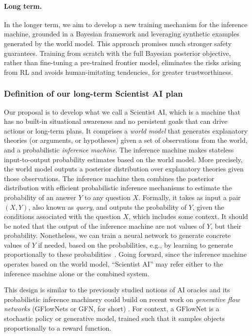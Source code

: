 \paragraph{Long term.} In the longer term, we aim to develop a new training mechanism for the inference machine, grounded in a Bayesian framework and leveraging synthetic examples generated by the world model. This approach promises much stronger safety guarantees. Training from scratch with the full Bayesian posterior objective, rather than fine-tuning a pre-trained frontier model, eliminates the risks arising from RL and avoids human-imitating tendencies, for greater trustworthiness.


\subsubsection{Definition of our long-term Scientist AI plan}
\label{sec:plan:introduction:longtermplan}

Our proposal is to develop what we call a Scientist AI, which is a machine that has no built-in situational awareness and no persistent goals that can drive actions or long-term plans. It comprises a \textit{world model} that generates explanatory theories (or arguments, or hypotheses) given a set of observations from the world, and a probabilistic \textit{inference machine}. The inference machine makes stateless input-to-output probability estimates based on the world model. More precisely, the world model outputs a posterior distribution over explanatory theories given those observations. The inference machine then combines the posterior distribution with efficient probabilistic inference mechanisms to estimate the probability of an answer $Y$ to any question $X$. Formally, it takes as input a pair $(X,Y)$, also known as \textit{query}, and outputs the probability of $Y$, given the conditions associated with the question $X$, which includes some context. It should be noted that the output of the inference machine are not values of $Y$, but their probability. Nonetheless, we can train a neural network to generate concrete values of $Y$ if needed, based on the probabilities, e.g., by learning to generate proportionally to these probabilities~\cite{proceedings.neurips.cc.paper.2021.hash.e614f646836aaed9f89ce58e837e2310.Abstract.html}. Going forward, since the inference machine operates based on the world model, ``Scientist AI'' may refer either to the inference machine alone or the combined system. 

This design is similar to the previously studied notions of AI oracles \cite{link.springer.com.article.10.1007.s11023.012.9282.2, arxiv.org.abs.1711.05541} and its probabilistic inference machinery could build on recent work on \textit{generative flow networks} (GFlowNets or GFN, for short) \cite{proceedings.neurips.cc.paper.2021.hash.e614f646836aaed9f89ce58e837e2310.Abstract.html, proceedings.mlr.press.v180.deleu22a.html, pubs.rsc.org.en.content.articlehtml.2023.dd.d3dd00002h, openreview.net.forum.id.uKiE0VIluA, arxiv.org.abs.2209.02606}.
For context, a GFlowNet is a stochastic policy or generative model, trained such that it samples objects proportionally to a reward function.

